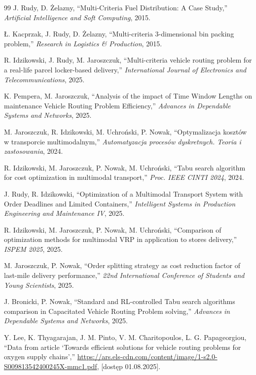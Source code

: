 \begin{thebibliography}{99}
J. Rudy, D. Żelazny,
“Multi-Criteria Fuel Distribution: A Case Study,”
\textit{Artificial Intelligence and Soft Computing}, 2015.

Ł. Kacprzak, J. Rudy, D. Żelazny,
“Multi-criteria 3-dimensional bin packing problem,”
\textit{Research in Logistics \& Production}, 2015.

R. Idzikowski, J. Rudy, M. Jaroszczuk,
“Multi-criteria vehicle routing problem for a real-life parcel locker-based delivery,”
\textit{International Journal of Electronics and Telecommunications}, 2025.

K. Pempera, M. Jaroszczuk,
“Analysis of the impact of Time Window Lengths on maintenance Vehicle Routing Problem Efficiency,”
\textit{Advances in Dependable Systems and Networks}, 2025.

M. Jaroszczuk, R. Idzikowski, M. Uchroński, P. Nowak,
“Optymalizacja kosztów w transporcie multimodalnym,”
\textit{Automatyzacja procesów dyskretnych. Teoria i zastosowania}, 2024.

R. Idzikowski, M. Jaroszczuk, P. Nowak, M. Uchroński,
“Tabu search algorithm for cost optimization in multimodal transport,”
\textit{Proc. IEEE CINTI 2024}, 2024.

J. Rudy, R. Idzikowski,
“Optimization of a Multimodal Transport System with Order Deadlines and Limited Containers,”
\textit{Intelligent Systems in Production Engineering and Maintenance IV}, 2025.

R. Idzikowski, M. Jaroszczuk, P. Nowak, M. Uchroński,
“Comparison of optimization methods for multimodal VRP in application to stores delivery,”
\textit{ISPEM 2025}, 2025.

M. Jaroszczuk, P. Nowak,
“Order splitting strategy as cost reduction factor of last-mile delivery performance,”
\textit{22nd International Conference of Students and Young Scientists}, 2025.

J. Bronicki, P. Nowak,
“Standard and RL-controlled Tabu search algorithms comparison in Capacitated Vehicle Routing Problem solving,”
\textit{Advances in Dependable Systems and Networks}, 2025.

Y. Lee, K. Thyagarajan, J. M. Pinto, V. M. Charitopoulos, L. G. Papageorgiou,
“Data from article ‘Towards efficient solutions for vehicle routing problems for oxygen supply chains’,”
\url{https://ars.els-cdn.com/content/image/1-s2.0-S009813542400245X-mmc1.pdf},
[dostęp 01.08.2025].


\end{thebibliography}
